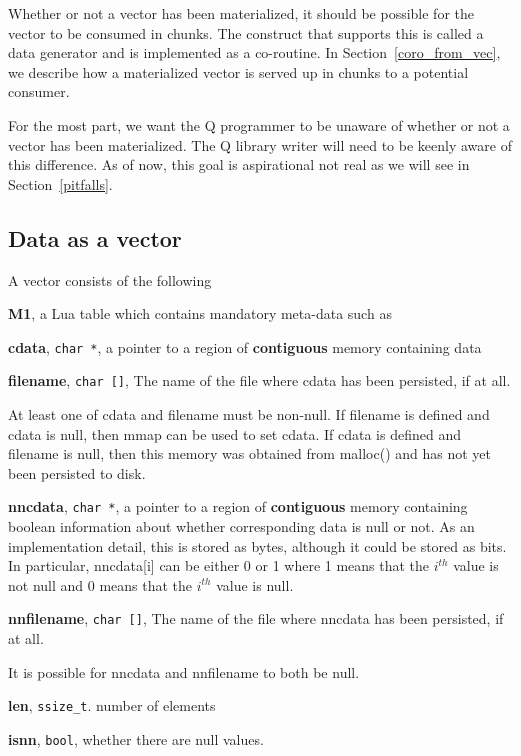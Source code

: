Whether or not a vector has been materialized, it should be possible for the
vector to be consumed in chunks. The construct that supports this is called a
data generator and is implemented as a co-routine. In
Section~\ref{coro_from_vec}, we describe how a materialized vector is served up
in chunks to a potential consumer.

For the most part, we want the Q programmer to be unaware of whether or not 
a vector has been materialized. The Q library writer will need to be keenly
aware of this difference. As of now, this goal is aspirational not real as we
will see in Section~\ref{pitfalls}.


\subsection{Data as a vector}
\label{data_vector}

A vector consists of the following
\be
\item {\bf M1}, a Lua table which contains mandatory meta-data such as 
\be
\item {\bf cdata}, \verb+char *+, a pointer to a region of {\bf contiguous} memory
containing data 
\item {\bf filename}, \verb+char []+, The name of the file where cdata has been
persisted, if at all. 

At least one of cdata and filename must be non-null.
If filename is defined and cdata is null, then mmap can be used to set cdata. If
cdata is defined and filename is null, then this memory was obtained from
malloc()
and has not yet been persisted to disk.
\item {\bf nncdata}, \verb+char *+, a pointer to a region of {\bf contiguous} memory
containing boolean information about whether corresponding data is null or not.
As an implementation detail, this is stored as bytes, although it could be
stored as bits. In particular, nncdata[i] can be either 0 or 1 where 
1 means that the \(i^{th}\) value is not null and 
0 means that the \(i^{th}\) value is null. 

\item {\bf nnfilename}, \verb+char []+, The name of the file where nncdata has been
persisted, if at all. 

It is possible for nncdata and nnfilename to both be null.
\item {\bf len}, \verb+ssize_t+. number of elements
\item {\bf isnn}, \verb+bool+, whether there are null values. 

